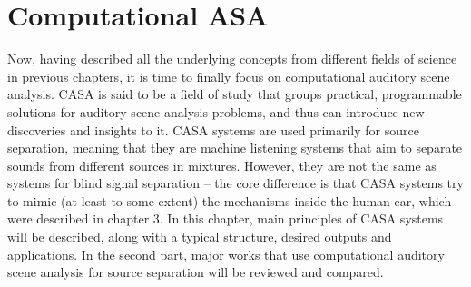 \chapter{Computational ASA}

Now, having described all the underlying concepts from different fields of science in previous chapters, it is time to finally focus on computational auditory scene analysis. CASA is said to be a field of study that groups practical, programmable solutions for auditory scene analysis problems, and thus can introduce new discoveries and insights to it. CASA systems are used primarily for source separation, meaning that they are machine listening systems that aim to separate sounds from different sources in mixtures. However, they are not the same as systems for blind signal separation – the core difference is that CASA systems try to mimic (at least to some extent) the mechanisms inside the human ear, which were described in chapter 3. In this chapter, main principles of CASA systems will be described, along with a typical structure, desired outputs and applications. In the second part, major works that use computational auditory scene analysis for source separation will be reviewed and compared.
